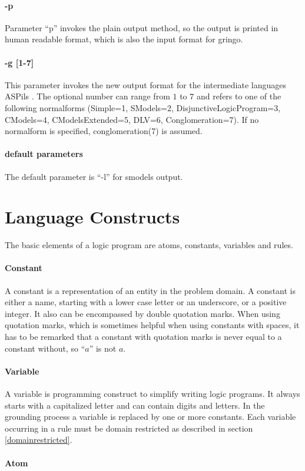 \documentclass[a4paper,10pt]{article}
\begin{document}
\paragraph{-p}
Parameter ``p'' invokes the plain output method, so the output is printed in human readable format, which is also the input format for gringo.
\paragraph{-g [1-7]}
This parameter invokes the new output format for the intermediate languages ASPils \cite{atleastthisreferenceishouldgive}. The optional number can range from $1$ to $7$ and refers to one of the following normalforms (Simple=1, SModels=2, DisjunctiveLogicProgram=3, CModels=4, CModelsExtended=5, DLV=6, Conglomeration=7). If no normalform is specified, conglomeration(7)  is assumed.

\paragraph{default parameters}
The default parameter is ``-l'' for smodels output.
\section{Language Constructs}
The basic elements of a logic program are atoms, constants, variables and rules.
\paragraph{Constant}
A constant is a representation of an entity in the problem domain.
A constant is either a name, starting with a lower case letter or an underscore, or a positive integer.
It also can be encompassed by double quotation marks. When using quotation marks, which is sometimes helpful when using constants with spaces, it has to be remarked that a constant with quotation marks is never equal to a constant without, so ``$a$'' is not $a$.
\paragraph{Variable}
A variable is programming construct to simplify writing logic programs.
It always starts with a capitalized letter and can contain digits and letters.
In the grounding process a variable is replaced by one or more constants.
Each variable occurring in a rule must be domain restricted as described in section \ref{domainrestricted}.
\paragraph{Atom}
\end{document}
